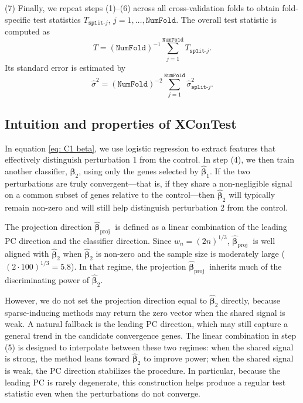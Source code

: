 \documentclass[11pt]{article}
\begin{document}
(7) Finally, we repeat steps (1)–(6) across all cross-validation folds to obtain fold-specific test statistics $T_{\texttt{split-}j}$, $j = 1,\ldots,\texttt{NumFold}$. The overall test statistic is computed as
$$
T = (\texttt{NumFold})^{-1}\sum_{j=1}^{\texttt{NumFold}} T_{\texttt{split-}j}.
$$
Its standard error is estimated by
$$
\hat\sigma^2 = (\texttt{NumFold})^{-2}\sum_{j=1}^{\texttt{NumFold}} \hat\sigma^2_{\texttt{split-}j}.
$$

\subsection*{Intuition and properties of XConTest}

In equation \eqref{eq: C1 beta}, we use logistic regression to extract features that effectively distinguish perturbation 1 from the control. In step (4), we then train another classifier, $\hat{\bm \beta}_2$, using only the genes selected by $\widehat{\bm{\beta}}_1$. If the two perturbations are truly convergent---that is, if they share a non-negligible signal on a common subset of genes relative to the control---then $\hat{\bm \beta}_2$ will typically remain non-zero and will still help distinguish perturbation 2 from the control.

The projection direction $\widehat{\boldsymbol{\beta}}_{\text {proj }}$ is defined as a linear combination of the leading PC direction and the classifier direction. Since $w_n = (2n)^{1/3}$, $\widehat{\boldsymbol{\beta}}_{\text {proj }}$ is well aligned with $\widehat{\boldsymbol{\beta}}_2$ when $\widehat{\boldsymbol{\beta}}_2$ is non-zero and the sample size is moderately large ($(2\cdot 100)^{1/3} = 5.8$). In that regime, the projection $\widehat{\boldsymbol{\beta}}_{\text {proj }}$ inherits much of the discriminating power of $\widehat{\boldsymbol{\beta}}_2$.

However, we do not set the projection direction equal to $\widehat{\boldsymbol{\beta}}_2$ directly, because sparse-inducing methods may return the zero vector when the shared signal is weak. A natural fallback is the leading PC direction, which may still capture a general trend in the candidate convergence genes. The linear combination in step (5) is designed to interpolate between these two regimes: when the shared signal is strong, the method leans toward $\widehat{\boldsymbol{\beta}}_2$ to improve power; when the shared signal is weak, the PC direction stabilizes the procedure. In particular, because the leading PC is rarely degenerate, this construction helps produce a regular test statistic even when the perturbations do not converge.
\end{document}
